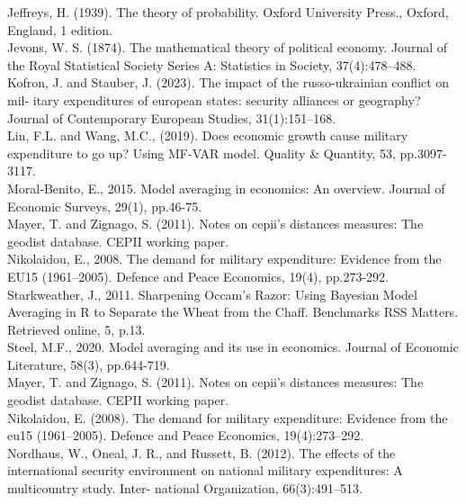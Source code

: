 \documentclass[12pt,a4paper]{article}
\begin{document}
Jeffreys, H. (1939). The theory of probability. Oxford University Press., Oxford, England, 1 edition. \\

Jevons, W. S. (1874). The mathematical theory of political economy. Journal of the Royal Statistical Society Series A: Statistics in Society, 37(4):478–488. \\

Kofron, J. and Stauber, J. (2023). The impact of the russo-ukrainian conflict on mil- itary expenditures of european states: security alliances or geography? Journal of Contemporary European Studies, 31(1):151–168. \\

Lin, F.L. and Wang, M.C., (2019). Does economic growth cause military expenditure to go up? Using MF-VAR model. Quality \& Quantity, 53, pp.3097-3117. \\

Moral‐Benito, E., 2015. Model averaging in economics: An overview. Journal of Economic Surveys, 29(1), pp.46-75.\\

Mayer, T. and Zignago, S. (2011). Notes on cepii’s distances measures: The geodist database. CEPII working paper.\\

Nikolaidou, E., 2008. The demand for military expenditure: Evidence from the EU15 (1961–2005). Defence and Peace Economics, 19(4), pp.273-292.\\

Starkweather, J., 2011. Sharpening Occam’s Razor: Using Bayesian Model Averaging in R to Separate the Wheat from the Chaff. Benchmarks RSS Matters. Retrieved online, 5, p.13.\\

Steel, M.F., 2020. Model averaging and its use in economics. Journal of Economic Literature, 58(3), pp.644-719.\\

Mayer, T. and Zignago, S. (2011). Notes on cepii’s distances measures: The geodist database. CEPII working paper. \\

Nikolaidou, E. (2008). The demand for military expenditure: Evidence from the eu15 (1961–2005). Defence and Peace Economics, 19(4):273–292. \\

Nordhaus, W., Oneal, J. R., and Russett, B. (2012). The effects of the international security environment on national military expenditures: A multicountry study. Inter- national Organization, 66(3):491–513. \\
\end{document}
